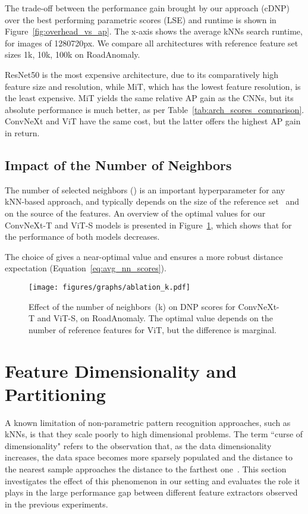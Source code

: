 \documentclass[10pt,twocolumn,letterpaper]{article}
\begin{document}
The trade-off between the performance gain brought by our approach (cDNP) over the best performing parametric scores (LSE) and runtime is shown in Figure~\ref{fig:overhead_vs_ap}.
The x-axis shows the average kNNs search runtime, for images of  1280720px. We compare all architectures with reference feature set sizes 1k, 10k, 100k on RoadAnomaly.

ResNet50 is the most expensive architecture, due to its comparatively high feature size and resolution, while MiT, which has the lowest feature resolution, is the least expensive. MiT yields the same relative AP gain as the CNNs, but its absolute performance is much better, as per Table~\ref{tab:arch_scores_comparison}.
ConvNeXt and ViT have the same cost, but the latter offers the highest AP gain in return.

\subsection{Impact of the Number of Neighbors}
\label{sec:ablation_k}
The number of selected neighbors () is an important hyperparameter for any kNN-based approach, and typically depends on the size of the reference set~\cite{sun2022knnood} and on the source of the features.
An overview of the optimal  values for our ConvNeXt-T and ViT-S models is presented in Figure~\ref{fig:k}, which shows that for  the performance of both models decreases.

The choice of  gives a near-optimal value and ensures a more robust distance expectation (Equation~\ref{eq:avg_nn_scores}).

\begin{figure}[h]
    \centering
    \texttt{[image: figures/graphs/ablation\_k.pdf]}
    \caption{Effect of the number of neighbors~(k) on DNP scores for ConvNeXt-T and ViT-S, on RoadAnomaly. The optimal  value depends on the number of reference features  for ViT, but the difference is marginal.
    }
    \label{fig:k}
\end{figure}

 \section{Feature Dimensionality and Partitioning}

A known limitation of non-parametric pattern recognition approaches, such as kNNs, is that they scale poorly to high dimensional problems. The term ``curse of dimensionality" refers to the observation that, as the data dimensionality increases, the data space becomes more sparsely populated and the distance to the nearest sample approaches the distance to the farthest one~\cite{Weber1998AQA, 10.1007/3-540-44503-X_27}. This section investigates the effect of this phenomenon in our setting and evaluates the role it plays in the large performance gap between different feature extractors observed in the previous experiments. 
\end{document}
